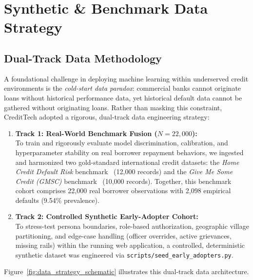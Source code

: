 \chapter{Synthetic \& Benchmark Data Strategy}
\label{chap:data_strategy}

\section{Dual-Track Data Methodology}
A foundational challenge in deploying machine learning within underserved credit environments is the \textit{cold-start data paradox}: commercial banks cannot originate loans without historical performance data, yet historical default data cannot be gathered without originating loans. Rather than masking this constraint, CreditTech adopted a rigorous, dual-track data engineering strategy:

\begin{enumerate}
  \item \textbf{Track 1: Real-World Benchmark Fusion ($N = 22,000$):}\\
  To train and rigorously evaluate model discrimination, calibration, and hyperparameter stability on real borrower repayment behaviors, we ingested and harmonized two gold-standard international credit datasets: the \textit{Home Credit Default Risk} benchmark~\cite{home_credit_2018} (12,000 records) and the \textit{Give Me Some Credit (GMSC)} benchmark~\cite{give_me_credit_2011} (10,000 records). Together, this benchmark cohort comprises 22,000 real borrower observations with 2,098 empirical defaults (9.54\% prevalence).
  
  \item \textbf{Track 2: Controlled Synthetic Early-Adopter Cohort:}\\
  To stress-test persona boundaries, role-based authorization, geographic village partitioning, and edge-case handling (officer overrides, active grievances, missing rails) within the running web application, a controlled, deterministic synthetic dataset was engineered via \texttt{scripts/seed\_early\_adopters.py}.
\end{enumerate}

Figure~\ref{fig:data_strategy_schematic} illustrates this dual-track data architecture.

